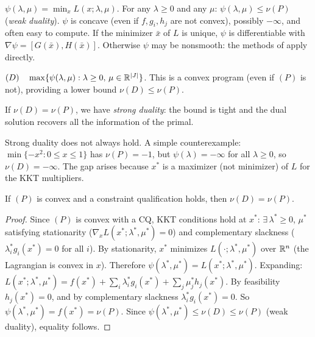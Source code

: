 \begin{definition}\label{def:lag-relax}
	$\psi(\lambda, \mu) = \min_{x} L(x; \lambda, \mu)$.
	For any $\lambda \geq 0$ and any $\mu$: $\psi(\lambda, \mu) \leq \nu(P)$ (\emph{weak duality}).
	$\psi$ is concave (even if $f, g_i, h_j$ are not convex), possibly $-\infty$, and often easy to compute.
	If the minimizer $\bar{x}$ of $L$ is unique, $\psi$ is differentiable with $\nabla\psi = [G(\bar{x}), H(\bar{x})]$.
	Otherwise $\psi$ may be nonsmooth: the methods of  apply directly.
\end{definition}

\begin{definition}\label{def:lag-dual}
	$(D) \quad \max\{\psi(\lambda, \mu) : \lambda \geq 0,\, \mu \in \mathbb{R}^{|J|}\}$.
	This is a convex program (even if $(P)$ is not), providing a lower bound $\nu(D) \leq \nu(P)$.
\end{definition}

\begin{definition}\label{def:strong-dual}
	If $\nu(D) = \nu(P)$, we have \emph{strong duality}: the bound is tight and the dual solution recovers all the information of the primal.
\end{definition}

Strong duality does not always hold.
A simple counterexample: $\min\{-x^2 : 0 \leq x \leq 1\}$ has $\nu(P) = -1$, but $\psi(\lambda) = -\infty$ for all $\lambda \geq 0$, so $\nu(D) = -\infty$.
The gap arises because $x^*$ is a maximizer (not minimizer) of $L$ for the KKT multipliers.

\begin{theorem}\label{thm:strong-dual-convex}
	If $(P)$ is convex and a constraint qualification holds, then $\nu(D) = \nu(P)$.
\end{theorem}
\begin{proof}
	Since $(P)$ is convex with a CQ, KKT conditions hold at $x^*$: $\exists\, \lambda^* \geq 0$, $\mu^*$ satisfying stationarity ($\nabla_x L(x^*; \lambda^*, \mu^*) = 0$) and complementary slackness ($\lambda_i^* g_i(x^*) = 0$ for all $i$).
	By stationarity, $x^*$ minimizes $L(\cdot; \lambda^*, \mu^*)$ over $\mathbb{R}^n$ (the Lagrangian is convex in $x$).
	Therefore $\psi(\lambda^*, \mu^*) = L(x^*; \lambda^*, \mu^*)$.
	Expanding: $L(x^*; \lambda^*, \mu^*) = f(x^*) + \sum_i \lambda_i^* g_i(x^*) + \sum_j \mu_j^* h_j(x^*)$.
	By feasibility $h_j(x^*) = 0$, and by complementary slackness $\lambda_i^* g_i(x^*) = 0$.
	So $\psi(\lambda^*, \mu^*) = f(x^*) = \nu(P)$.
	Since $\psi(\lambda^*, \mu^*) \leq \nu(D) \leq \nu(P)$ (weak duality), equality follows.
\end{proof}

